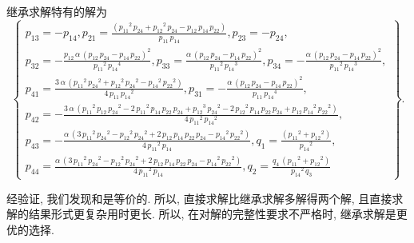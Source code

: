 继承求解特有的解为 
\begin{equation}
\renewcommand{\arraystretch}{1.2}
\left\{
\begin{array}{l}
{{p}_{13}}=-{{p}_{14}},
{{p}_{21}}=\frac{\left( {{{p}_{11}}}^{2}\,{{p}_{24}}+{{{p}_{12}}}^{2}\,{{p}_{24}}-{{p}_{12}}\,{{p}_{14}}\,{{p}_{22}}\right) }{{{p}_{11}}\,{{p}_{14}}},
{{p}_{23}}=-{{p}_{24}},\\
{{p}_{32}}=-\frac{{{p}_{12}}\,\alpha\,\left( {{p}_{12}}\,{{p}_{24}}-{{p}_{14}}\,{{p}_{22}}\right) ^{2}}{{{{p}_{11}}}^{2}\,{{{p}_{14}}}^{4}},
{{p}_{33}}=\frac{\alpha\,\left( {{p}_{12}}\,{{p}_{24}}-{{p}_{14}}\,{{p}_{22}}\right) ^{2}}{{{{p}_{11}}}^{2}\,{{{p}_{14}}}^{3}},
{{p}_{34}}=-\frac{\alpha\,\left( {{p}_{12}}\,{{p}_{24}}-{{p}_{14}}\,{{p}_{22}}\right) ^{2}}{{{{p}_{11}}}^{2}\,{{{p}_{14}}}^{3}},\\
{{p}_{41}}=\frac{3\,\alpha\,\left( {{{p}_{11}}}^{2}\,{{{p}_{24}}}^{2}+{{{p}_{12}}}^{2}\,{{{p}_{24}}}^{2}-{{{p}_{14}}}^{2}\,{{{p}_{22}}}^{2}\right) }{4\,{{p}_{11}}\,{{{p}_{14}}}^{2}},
{{p}_{31}}=-\frac{\alpha\,\left( {{p}_{12}}\,{{p}_{24}}-{{p}_{14}}\,{{p}_{22}}\right) ^{2}}{{{p}_{11}}\,{{{p}_{14}}}^{4}},\\
{{p}_{42}}=-\frac{3\,\alpha\,\left( {{{p}_{11}}}^{2}\,{{p}_{12}}\,{{{p}_{24}}}^{2}-2\,{{{p}_{11}}}^{2}\,{{p}_{14}}\,{{p}_{22}}\,{{p}_{24}}+{{{p}_{12}}}^{3}\,{{{p}_{24}}}^{2}-2\,{{{p}_{12}}}^{2}\,{{p}_{14}}\,{{p}_{22}}\,{{p}_{24}}+{{p}_{12}}\,{{{p}_{14}}}^{2}\,{{{p}_{22}}}^{2}\right) }{4\,{{{p}_{11}}}^{2}\,{{{p}_{14}}}^{2}},\\ 
{{p}_{43}}=-\frac{\alpha\,\left( 3\,{{{p}_{11}}}^{2}\,{{{p}_{24}}}^{2}-{{{p}_{12}}}^{2}\,{{{p}_{24}}}^{2}+2\,{{p}_{12}}\,{{p}_{14}}\,{{p}_{22}}\,{{p}_{24}}-{{{p}_{14}}}^{2}\,{{{p}_{22}}}^{2}\right) }{4\,{{{p}_{11}}}^{2}\,{{p}_{14}}},
{{q}_{1}}=\frac{\left( {{{p}_{11}}}^{2}+{{{p}_{12}}}^{2}\right) }{{{{p}_{14}}}^{2}},\\ 
{{p}_{44}}=\frac{\alpha\,\left( 3\,{{{p}_{11}}}^{2}\,{{{p}_{24}}}^{2}-{{{p}_{12}}}^{2}\,{{{p}_{24}}}^{2}+2\,{{p}_{12}}\,{{p}_{14}}\,{{p}_{22}}\,{{p}_{24}}-{{{p}_{14}}}^{2}\,{{{p}_{22}}}^{2}\right) }{4\,{{{p}_{11}}}^{2}\,{{p}_{14}}},
{{q}_{2}}=\frac{{{q}_{4}}\,\left( {{{p}_{11}}}^{2}+{{{p}_{12}}}^{2}\right) }{{{{p}_{14}}}^{2}\,{{q}_{3}}}
\end{array}
\right\}. \label{2S1L-plot}
\end{equation}

经验证, 我们发现和是等价的. 所以, 直接求解比继承求解多解得两个解, 且直接求解的结果形式更复杂\D 用时更长. 所以, 在对解的完整性要求不严格时, 继承求解是更优的选择.

